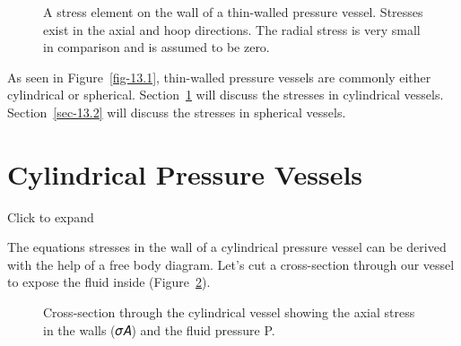 \documentclass[
  letterpaper,
  DIV=11,
  numbers=noendperiod]{scrreprt}
\theoremstyle{definition}
\theoremstyle{remark}
\begin{document}
\begin{figure}


\caption{\label{fig-13.2}A stress element on the wall of a thin-walled
pressure vessel. Stresses exist in the axial and hoop directions. The
radial stress is very small in comparison and is assumed to be zero.}

\end{figure}%

As seen in Figure~\ref{fig-13.1}, thin-walled pressure vessels are
commonly either cylindrical or spherical. Section~\ref{sec-13.1} will
discuss the stresses in cylindrical vessels. Section~\ref{sec-13.2} will
discuss the stresses in spherical vessels.

\section{Cylindrical Pressure Vessels}\label{sec-13.1}

Click to expand

The equations stresses in the wall of a cylindrical pressure vessel can
be derived with the help of a free body diagram. Let's cut a
cross-section through our vessel to expose the fluid inside
(Figure~\ref{fig-13.3}).

\begin{figure}


\caption{\label{fig-13.3}Cross-section through the cylindrical vessel
showing the axial stress in the walls (𝜎𝐴) and the fluid pressure P.}

\end{figure}%
\end{document}
